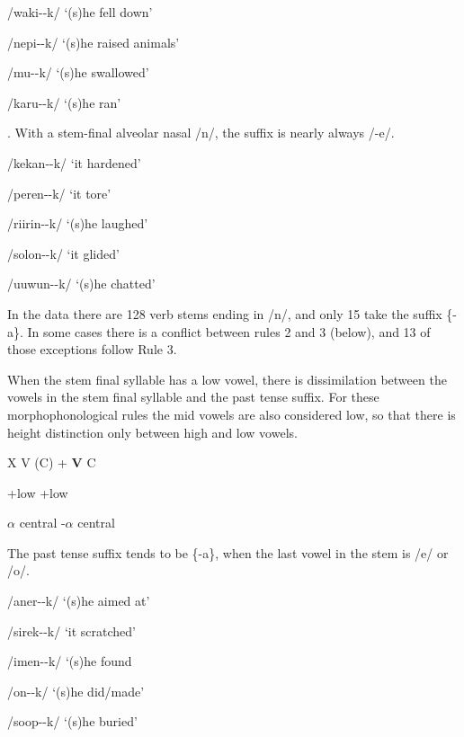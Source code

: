 /waki--k/  `(s)he fell down'

/nepi--k/  `(s)he raised animals'

/mu--k/  `(s)he swallowed'

/karu--k/  `(s)he ran'

.  With a stem-final alveolar nasal /n/, the suffix is nearly always /-e/.

/kekan--k/  `it hardened'

/peren--k/  `it tore'

/riirin--k/  `(s)he laughed'

/solon--k/  `it glided'

/uuwun--k/  `(s)he chatted'

In the data there are 128 verb stems ending in /n/, and only 15 take the suffix \{\nobreakdash-a\}. In some cases there is a conflict between rules 2 and 3 (below), and 13 of those exceptions follow Rule 3.

 When the stem final syllable has a low vowel, there is dissimilation between the vowels in the stem final syllable and the past tense suffix. For these morphophonological rules the mid vowels are also considered low, so that there is height distinction only between high and low vowels.

\textsc{X  V  (C)}      + \textsc{ \textbf{V}  C}

    +low    +low

    $\alpha $ central    -$\alpha $ central

The past tense suffix tends to be \{-a\}, when the last vowel in the stem is /e/ or /o/. 

/aner--k/  `(s)he aimed at'

/sirek--k/  `it scratched'

/imen--k/  `(s)he found

/on--k/  `(s)he did/made'

/soop--k/  `(s)he buried'

